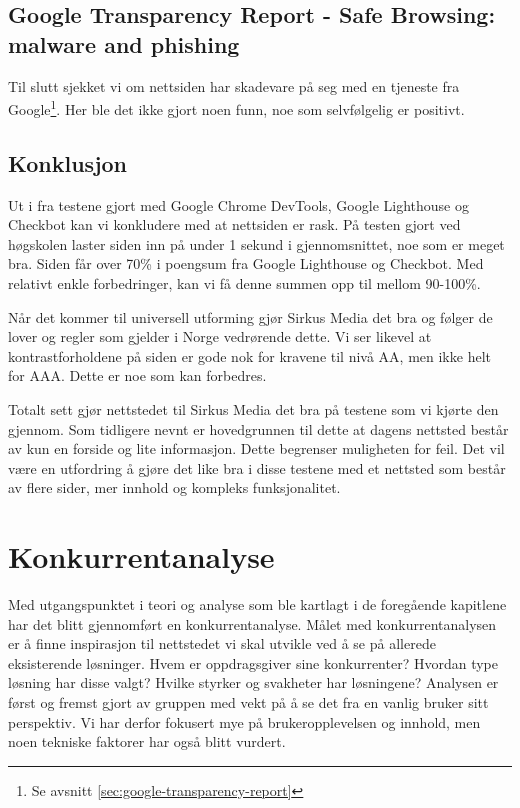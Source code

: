 \subsection{Google Transparency Report - Safe Browsing: malware and phishing}
Til slutt sjekket vi om nettsiden har skadevare på seg med en tjeneste fra Google\footnote{Se avsnitt \ref{sec:google-transparency-report}}. Her ble det ikke gjort noen funn, noe som selvfølgelig er positivt.

\subsection{Konklusjon}
Ut i fra testene gjort med Google Chrome DevTools, Google Lighthouse og Checkbot kan vi konkludere med at nettsiden er rask. På testen gjort ved høgskolen laster siden inn på under 1 sekund i gjennomsnittet, noe som er meget bra. Siden får over 70\% i poengsum fra Google Lighthouse og Checkbot. Med relativt enkle forbedringer, kan vi få denne summen opp til mellom 90-100\%.

Når det kommer til universell utforming gjør Sirkus Media det bra og følger de lover og regler som gjelder i Norge vedrørende dette. Vi ser likevel at kontrastforholdene på siden er gode nok for kravene til nivå AA, men ikke helt for AAA. Dette er noe som kan forbedres.

Totalt sett gjør nettstedet til Sirkus Media det bra på testene som vi kjørte den gjennom. Som tidligere nevnt er hovedgrunnen til dette at dagens nettsted består av kun en forside og lite informasjon. Dette begrenser muligheten for feil. Det vil være en utfordring å gjøre det like bra i disse testene med et nettsted som består av flere sider, mer innhold og kompleks funksjonalitet.

\section{Konkurrentanalyse}

Med utgangspunktet i teori og analyse som ble kartlagt i de foregående kapitlene har det blitt gjennomført en konkurrentanalyse. Målet med konkurrentanalysen er å finne inspirasjon til nettstedet vi skal utvikle ved å se på allerede eksisterende løsninger. Hvem er oppdragsgiver sine konkurrenter? Hvordan type løsning har disse valgt? Hvilke styrker og svakheter har løsningene? Analysen er først og fremst gjort av gruppen med vekt på å se det fra en vanlig bruker sitt perspektiv. Vi har derfor fokusert mye på brukeropplevelsen og innhold, men noen tekniske faktorer har også blitt vurdert.

